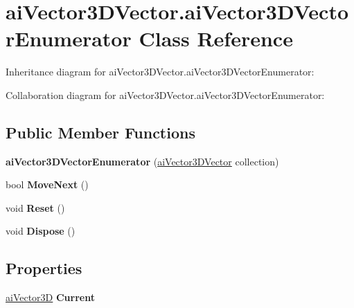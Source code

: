 \hypertarget{classai_vector3_d_vector_1_1ai_vector3_d_vector_enumerator}{\section{ai\+Vector3\+D\+Vector.\+ai\+Vector3\+D\+Vector\+Enumerator Class Reference}
\label{classai_vector3_d_vector_1_1ai_vector3_d_vector_enumerator}
}


Inheritance diagram for ai\+Vector3\+D\+Vector.\+ai\+Vector3\+D\+Vector\+Enumerator\+:


Collaboration diagram for ai\+Vector3\+D\+Vector.\+ai\+Vector3\+D\+Vector\+Enumerator\+:
\subsection*{Public Member Functions}
\begin{DoxyCompactItemize}
\item 
\hypertarget{classai_vector3_d_vector_1_1ai_vector3_d_vector_enumerator_a34461c30c04e745ad87f8f12a7fe845f}{{\bfseries ai\+Vector3\+D\+Vector\+Enumerator} (\hyperlink{classai_vector3_d_vector}{ai\+Vector3\+D\+Vector} collection)}\label{classai_vector3_d_vector_1_1ai_vector3_d_vector_enumerator_a34461c30c04e745ad87f8f12a7fe845f}

\item 
\hypertarget{classai_vector3_d_vector_1_1ai_vector3_d_vector_enumerator_a26e306f060495a500563dfb7e349c9f4}{bool {\bfseries Move\+Next} ()}\label{classai_vector3_d_vector_1_1ai_vector3_d_vector_enumerator_a26e306f060495a500563dfb7e349c9f4}

\item 
\hypertarget{classai_vector3_d_vector_1_1ai_vector3_d_vector_enumerator_ad6a9cb0531b1359ccde3a238448dfc97}{void {\bfseries Reset} ()}\label{classai_vector3_d_vector_1_1ai_vector3_d_vector_enumerator_ad6a9cb0531b1359ccde3a238448dfc97}

\item 
\hypertarget{classai_vector3_d_vector_1_1ai_vector3_d_vector_enumerator_a29935fdac31518bf6666ef590266a0b7}{void {\bfseries Dispose} ()}\label{classai_vector3_d_vector_1_1ai_vector3_d_vector_enumerator_a29935fdac31518bf6666ef590266a0b7}

\end{DoxyCompactItemize}
\subsection*{Properties}
\begin{DoxyCompactItemize}
\item 
\hypertarget{classai_vector3_d_vector_1_1ai_vector3_d_vector_enumerator_aa485fefe8081ca90212554ab8908b8e2}{\hyperlink{structai_vector3_d}{ai\+Vector3\+D} {\bfseries Current}}\label{classai_vector3_d_vector_1_1ai_vector3_d_vector_enumerator_aa485fefe8081ca90212554ab8908b8e2}

\end{DoxyCompactItemize}


